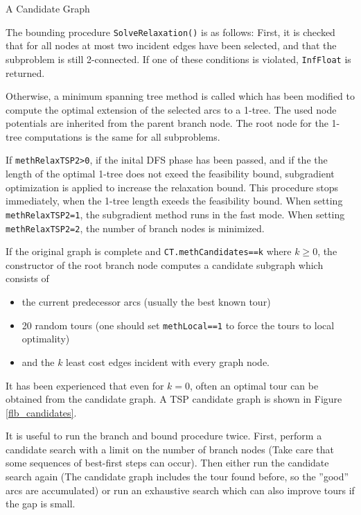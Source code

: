 \documentclass[a4paper,11pt,twoside]{book}
\begin{document}
\begin{multicols}{2}
\bigskip
\begin{figurehere}
\begin{center}
\epsfxsize=7cm
\vspace{0.5cm}
\caption{\label{flb_candidates}A Candidate Graph}
\end{center}
\end{figurehere}

\noindent
The bounding procedure \verb/SolveRelaxation()/ is as follows: First,
it is checked that for all nodes at most two incident edges have been selected,
and that the subproblem is still 2-connected. If one of these conditions is
violated, \verb/InfFloat/ is returned.

Otherwise, a minimum spanning tree method is called which has been modified to
compute the optimal extension of the selected arcs to a 1-tree. The used node
potentials are inherited from the parent branch node.  The root node for the
1-tree computations is the same for all subproblems.

If \verb/methRelaxTSP2>0/, if the inital DFS phase has been passed, and if the
the length of the optimal 1-tree does not exeed the feasibility bound,
subgradient optimization is applied to increase the relaxation bound. This
procedure stops immediately, when the 1-tree length exeeds the feasibility
bound. When setting \verb/methRelaxTSP2=1/, the subgradient method runs in the
fast mode. When setting \verb/methRelaxTSP2=2/, the number of branch nodes is
minimized.

If the original graph is complete and \verb/CT.methCandidates==k/ where
$k\geq 0$, the constructor of the root branch node computes a candidate
subgraph which consists of
\begin{itemize}
\item the current predecessor arcs (usually the best known tour)
\item 20 random tours (one should set \verb/methLocal==1/ to force the tours
    to local optimality)
\item and the $k$ least cost edges incident with every graph node.
\end{itemize}
It has been experienced that even for $k=0$, often an optimal tour can be
obtained from the candidate graph. A TSP candidate graph is shown in Figure
\ref{flb_candidates}.

It is useful to run the branch and bound procedure twice. First, perform a
candidate search with a limit on the number of branch nodes (Take care that
some sequences of best-first steps can occur). Then either run the candidate
search again (The candidate graph includes the tour found before, so the
''good'' arcs are accumulated) or run an exhaustive search which can also
improve tours if the gap is small.


\end{multicols}
\end{document}

